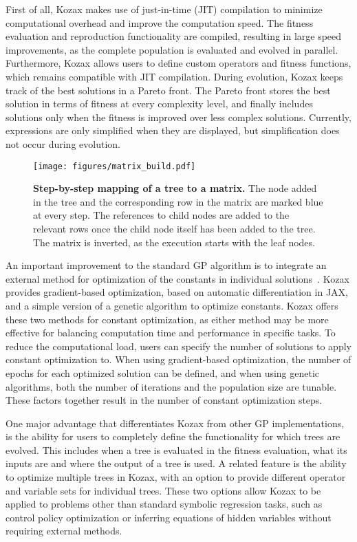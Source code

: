 \documentclass{article}
\begin{document}
First of all, Kozax makes use of just-in-time (JIT) compilation to minimize computational overhead and improve the computation speed. The fitness evaluation and reproduction functionality are compiled, resulting in large speed improvements, as the complete population is evaluated and evolved in parallel. Furthermore, Kozax allows users to define custom operators and fitness functions, which remains compatible with JIT compilation. During evolution, Kozax keeps track of the best solutions in a Pareto front. The Pareto front stores the best solution in terms of fitness at every complexity level, and finally includes solutions only when the fitness is improved over less complex solutions. Currently, expressions are only simplified when they are displayed, but simplification does not occur during evolution.

\begin{figure*}[!t]
    \centering
    \texttt{[image: figures/matrix\_build.pdf]}
    \caption{\textbf{Step-by-step mapping of a tree to a matrix.} The node added in the tree and the corresponding row in the matrix are marked blue at every step. The references to child nodes are added to the relevant rows once the child node itself has been added to the tree. The matrix is inverted, as the execution starts with the leaf nodes.}
    \label{app: matrix}
\end{figure*}

An important improvement to the standard GP algorithm is to integrate an external method for optimization of the constants in individual solutions~\cite{topchy2001faster}. Kozax provides gradient-based optimization, based on automatic differentiation in JAX, and a simple version of a genetic algorithm to optimize constants. Kozax offers these two methods for constant optimization, as either method may be more effective for balancing computation time and performance in specific tasks. To reduce the computational load, users can specify the number of solutions to apply constant optimization to. When using gradient-based optimization, the number of epochs for each optimized solution can be defined, and when using genetic algorithms, both the number of iterations and the population size are tunable. These factors together result in the number of constant optimization steps.

One major advantage that differentiates Kozax from other GP implementations, is the ability for users to completely define the functionality for which trees are evolved. This includes when a tree is evaluated in the fitness evaluation, what its inputs are and where the output of a tree is used. A related feature is the ability to optimize multiple trees in Kozax, with an option to provide different operator and variable sets for individual trees. These two options allow Kozax to be applied to problems other than standard symbolic regression tasks, such as control policy optimization or inferring equations of hidden variables without requiring external methods.
\end{document}
